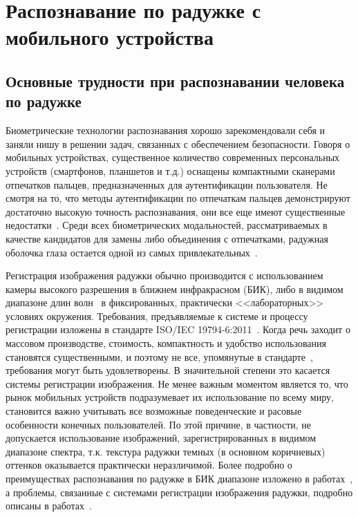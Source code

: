 \chapter{Распознавание по радужке с мобильного устройства}

\section{Основные трудности при распознавании человека по радужке}
\label{sec:main_difficulties_mobile}

Биометрические технологии распознавания хорошо зарекомендовали себя и заняли нишу в решении задач, связанных с обеспечением безопасности. Говоря о мобильных устройствах, существенное количество современных персональных устройств (смартфонов, планшетов и т.д.) оснащены компактными сканерами отпечатков пальцев, предназначенных для аутентификации пользователя. Не смотря на то, что методы аутентификации по отпечаткам пальцев демонстрируют достаточно высокую точность распознавания, они все еще имеют существенные недостатки~\cite{daugman_probing_2006}. Среди всех биометрических модальностей, рассматриваемых в качестве кандидатов для замены либо объединения с отпечатками, радужная оболочка глаза остается одной из самых привлекательных~\cite{bowyer_survey_2008,corcoran_2014,daugman_epigenetic_2001,survey_10-15}.

Регистрация изображения радужки обычно производится с использованием камеры высокого разрешения в ближнем инфракрасном (БИК), либо в видимом диапазоне длин волн~\cite{prabhakar_2011} в фиксированных, практически <<лабораторных>> условиях окружения. Требования, предъявляемые к системе и процессу регистрации изложены в стандарте ISO/IEC 19794-6:2011~\cite{iso_iris}. Когда речь заходит о массовом производстве, стоимость, компактность и удобство использования становятся существенными, и поэтому не все, упомянутые в стандарте~\cite{iso_iris}, требования могут быть удовлетворены. В значительной степени это касается системы регистрации изображения. Не менее важным моментом является то, что рынок мобильных устройств подразумевает их использование по всему миру, становится важно учитывать все возможные поведенческие и расовые особенности конечных пользователей. По этой причине, в частности, не допускается использование изображений, зарегистрированных в видимом диапазоне спектра, т.к. текстура радужки темных (в основном коричневых) оттенков оказывается практически неразличимой. Более подробно о преимуществах распознавания по радужке в БИК диапазоне изложено в работах~\cite{iso_iris,corcoran_2014,daugman_epigenetic_2001,daugman_how_works}, а проблемы, связанные с системами регистрации изображения радужки, подробно описаны в работах~\cite{prabhakar_2011,corcoran_2014}.

